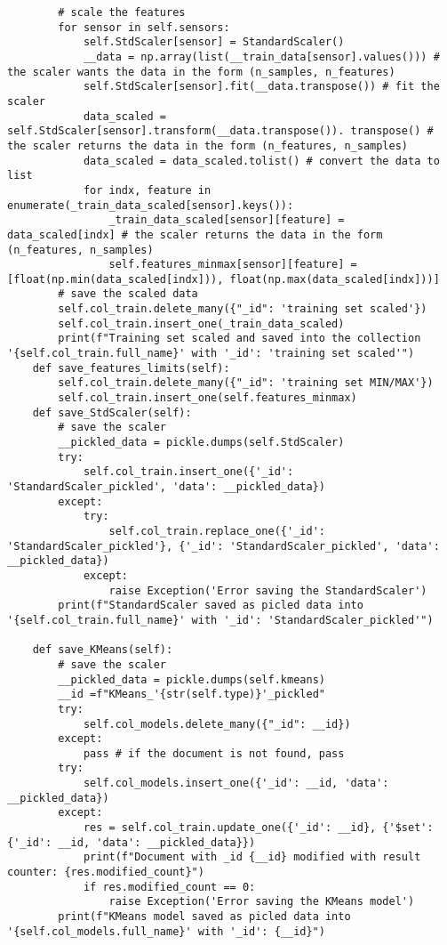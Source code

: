 \begin{verbatim}
        # scale the features
        for sensor in self.sensors:
            self.StdScaler[sensor] = StandardScaler()
            __data = np.array(list(__train_data[sensor].values())) # the scaler wants the data in the form (n_samples, n_features)
            self.StdScaler[sensor].fit(__data.transpose()) # fit the scaler
            data_scaled = self.StdScaler[sensor].transform(__data.transpose()). transpose() # the scaler returns the data in the form (n_features, n_samples)
            data_scaled = data_scaled.tolist() # convert the data to list    
            for indx, feature in enumerate(_train_data_scaled[sensor].keys()):
                _train_data_scaled[sensor][feature] = data_scaled[indx] # the scaler returns the data in the form (n_features, n_samples)
                self.features_minmax[sensor][feature] = [float(np.min(data_scaled[indx])), float(np.max(data_scaled[indx]))]
        # save the scaled data
        self.col_train.delete_many({"_id": 'training set scaled'}) 
        self.col_train.insert_one(_train_data_scaled) 
        print(f"Training set scaled and saved into the collection '{self.col_train.full_name}' with '_id': 'training set scaled'")
    def save_features_limits(self):
        self.col_train.delete_many({"_id": 'training set MIN/MAX'}) 
        self.col_train.insert_one(self.features_minmax)
    def save_StdScaler(self):
        # save the scaler
        __pickled_data = pickle.dumps(self.StdScaler)
        try:
            self.col_train.insert_one({'_id': 'StandardScaler_pickled', 'data': __pickled_data})
        except:
            try:
                self.col_train.replace_one({'_id': 'StandardScaler_pickled'}, {'_id': 'StandardScaler_pickled', 'data': __pickled_data})
            except:
                raise Exception('Error saving the StandardScaler')
        print(f"StandardScaler saved as picled data into '{self.col_train.full_name}' with '_id': 'StandardScaler_pickled'")
    
    def save_KMeans(self):
        # save the scaler
        __pickled_data = pickle.dumps(self.kmeans)
        __id =f"KMeans_'{str(self.type)}'_pickled"
        try:
            self.col_models.delete_many({"_id": __id})
        except:
            pass # if the document is not found, pass
        try:
            self.col_models.insert_one({'_id': __id, 'data': __pickled_data})
        except:
            res = self.col_train.update_one({'_id': __id}, {'$set': {'_id': __id, 'data': __pickled_data}})
            print(f"Document with _id {__id} modified with result counter: {res.modified_count}")
            if res.modified_count == 0:
                raise Exception('Error saving the KMeans model')
        print(f"KMeans model saved as picled data into '{self.col_models.full_name}' with '_id': {__id}")
    

\end{verbatim}
